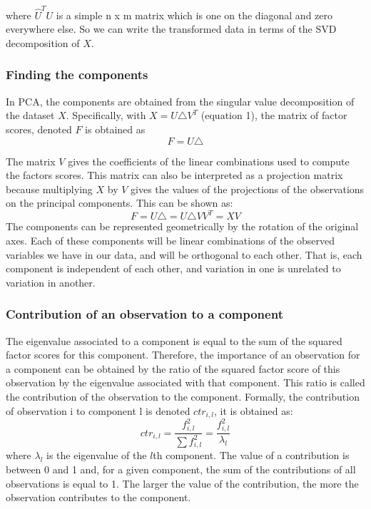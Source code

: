 \documentclass[12pt,twoside]{article}
\begin{document}
where $\hat{U}^{T}U$ is a simple n x m matrix which is one on the diagonal and zero everywhere else. So we can write the transformed data in terms of the SVD decomposition of $X$. 


\subsubsection{Finding the components}

In PCA, the components are obtained from the singular value decomposition of the dataset $X$. Specifically, with $X = U\triangle V^{T}$ (equation 1), the matrix of factor scores, denoted $F$ is obtained as
\begin{equation}
F = U\triangle
\end{equation}

The matrix $V$ gives the coefficients of the linear combinations used to compute the factors scores. This matrix can also be interpreted as a projection matrix because multiplying $X$ by $V$ gives the values of the projections of the observations on the principal components. This can be shown as:
\begin{equation}
F = U\triangle = U\triangle VV^{T}  = XV
\end{equation}
\bigbreak
The components can be represented geometrically by the rotation of the original axes. Each of these components will be linear combinations of the observed variables we have in our data, and will be orthogonal to each other. That is, each component is independent of each other, and variation in one is unrelated to variation in another. 

\subsubsection{Contribution of an observation to a component}

The eigenvalue associated to a component is equal to the sum of the squared factor scores for this component. Therefore, the importance of an observation for a component can be obtained by the ratio of the squared factor score of this observation by the eigenvalue associated with that component. This ratio is called the contribution of the observation to the component. Formally, the contribution of observation i to component l is denoted $ ctr_{i,l}$, it is obtained as:
\begin{equation}
ctr_{i,l} = \frac{f^2_{i,l} }{\sum f^2_{i,l}} = \frac{f^2_{i,l} }{\lambda_{l}}
\end{equation}
where $\lambda_{l}$ is the eigenvalue of the $l$th component. The value of a contribution is between 0 and 1 and, for a given component, the sum of the contributions of all observations is equal to 1. The larger the value of the contribution, the more the observation contributes to the component. 
\end{document}
